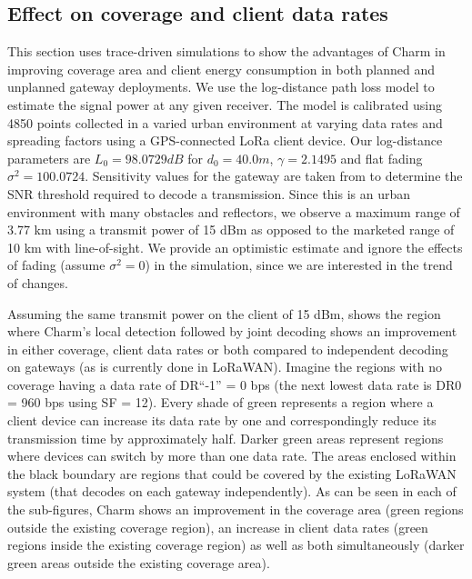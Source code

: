 \subsection{Effect on coverage and client data rates}
\label{sec:coverage-data-rate-improvement}

This section uses trace-driven simulations to show the advantages of Charm in improving coverage area and client energy consumption in both planned and unplanned gateway deployments. We use the log-distance path loss model to estimate the signal power at any given receiver. The model is calibrated using 4850 points collected in a varied urban environment at varying data rates and spreading factors using a GPS-connected LoRa client device. Our log-distance parameters are $L_0  = 98.0729 dB$ for $d_0 = 40.0 m$, $\gamma = 2.1495$ and flat fading $\sigma^2 = 100.0724$. Sensitivity values for the gateway are taken from \cite{Bor2016} to determine the SNR threshold required to decode a transmission. Since this is an urban environment with many obstacles and reflectors, we observe a maximum range of 3.77 km using a transmit power of 15 dBm as opposed to the marketed range of 10 km with line-of-sight. We provide an optimistic estimate and ignore the effects of fading (assume $\sigma^2 = 0$) in the simulation, since we are interested in the trend of changes.

Assuming the same transmit power on the client of 15 dBm,  shows the region where Charm's local detection followed by joint decoding shows an improvement in either coverage, client data rates or both compared to independent decoding on gateways (as is currently done in LoRaWAN). Imagine the regions with no coverage having a data rate of DR``-1'' = 0 bps (the next lowest data rate is DR0 = 960 bps using SF = 12). Every shade of green represents a region where a client device can increase its data rate by one and correspondingly reduce its transmission time by approximately half. Darker green areas represent regions where devices can switch by more than one data rate. The areas enclosed within the black boundary are regions that could be covered by the existing LoRaWAN system (that decodes on each gateway independently). As can be seen in each of the sub-figures, Charm shows an improvement in the coverage area (green regions outside the existing coverage region), an increase in client data rates (green regions inside the existing coverage region) as well as both simultaneously (darker green areas outside the existing coverage area).

